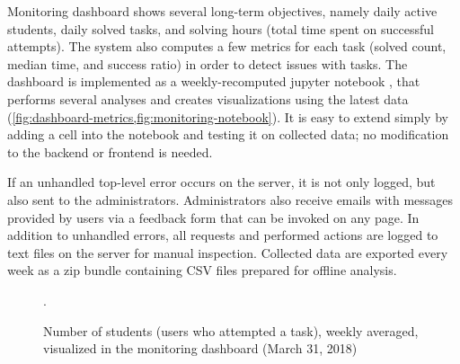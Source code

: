 Monitoring dashboard
  shows several long-term objectives, %
  namely daily active students, daily solved tasks, and
  solving hours (total time spent on successful attempts).
  The system also computes a few metrics for each task
  (solved count, median time, and success ratio) in order to detect
  issues with tasks. %
The dashboard is implemented as a weekly-recomputed jupyter notebook \cite{jupyter-notebooks},
  that performs several analyses
  and creates visualizations using the latest data
  (\cref{fig:dashboard-metrics,fig:monitoring-notebook}).
  It is easy to extend simply by adding
  a cell into the notebook and testing it on collected data;
  no modification to the backend or frontend is needed.

  If an unhandled top-level error occurs on the server,
  it is not only logged, but also sent to the administrators.
  Administrators also receive emails with messages provided by users via
  a feedback form that can be invoked on any page.
  In addition to unhandled errors, all requests and performed actions are
  logged to text files on the server for manual inspection.
  Collected data are exported every week as a zip bundle containing
  CSV files prepared for %
  offline analysis.

\begin{figure}[htb]
\centering
{}
\caption{%
  Number of students (users who attempted a task), weekly averaged, visualized
  in the monitoring dashboard (March 31, 2018)}.
\label{fig:dashboard-metrics}
\end{figure}

